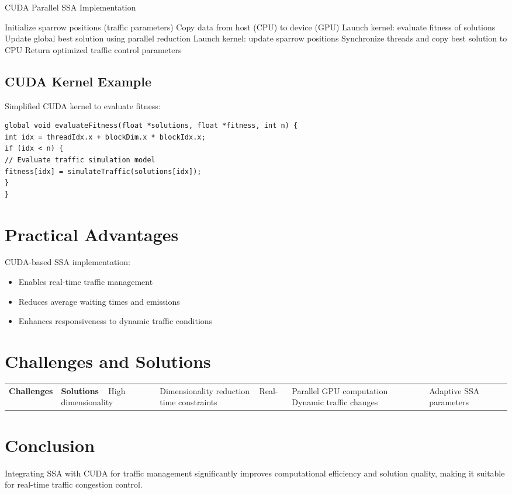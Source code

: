 \documentclass{article}
\begin{document}
\begin{algorithm}
\caption{CUDA Parallel SSA Implementation}
\begin{algorithmic}[1]
\State Initialize sparrow positions (traffic parameters)
\State Copy data from host (CPU) to device (GPU)
\State Launch kernel: evaluate fitness of solutions
\State Update global best solution using parallel reduction
\State Launch kernel: update sparrow positions
\State Synchronize threads and copy best solution to CPU
\EndWhile
\State Return optimized traffic control parameters
\end{algorithmic}
\end{algorithm}

\subsection{CUDA Kernel Example}
Simplified CUDA kernel to evaluate fitness:

\begin{lstlisting}
global void evaluateFitness(float *solutions, float *fitness, int n) {
int idx = threadIdx.x + blockDim.x * blockIdx.x;
if (idx < n) {
// Evaluate traffic simulation model
fitness[idx] = simulateTraffic(solutions[idx]);
}
}
\end{lstlisting}

\section{Practical Advantages}

CUDA-based SSA implementation:
\begin{itemize}
\item Enables real-time traffic management
\item Reduces average waiting times and emissions
\item Enhances responsiveness to dynamic traffic conditions
\end{itemize}

\section{Challenges and Solutions}

\begin{tabular}{|p{5cm}|p{5cm}|}
\hline
\textbf{Challenges} & \textbf{Solutions} \ \hline
High dimensionality & Dimensionality reduction \ \hline
Real-time constraints & Parallel GPU computation \ \hline
Dynamic traffic changes & Adaptive SSA parameters \ \hline
\end{tabular}

\section{Conclusion}
Integrating SSA with CUDA for traffic management significantly improves computational efficiency and solution quality, making it suitable for real-time traffic congestion control.
\end{document}
